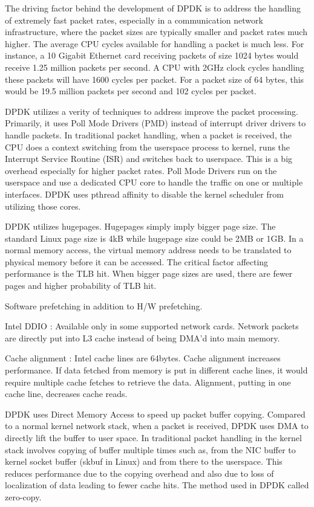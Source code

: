 \documentclass[english, 12pt, a4paper, elec, utf8, a-1b, online]{aaltothesis}
\begin{document}
The driving factor behind the development of DPDK is to address the handling of extremely fast packet rates, especially in a communication network infrastructure, where the packet sizes are typically smaller and packet rates much higher. The average CPU cycles available for handling a packet is much less. For instance, a 10 Gigabit Ethernet card receiving packets of size 1024 bytes would receive 1.25 million packets per second. A CPU with 2GHz clock cycles handling these packets will have 1600 cycles per packet. For a packet size of 64 bytes, this would be 19.5 million packets per second and 102 cycles per packet. 

DPDK utilizes a verity of techniques to address improve the packet processing. Primarily, it uses Poll Mode Drivers (PMD) instead of interrupt driver drivers to handle packets. In traditional packet handling, when a packet is received, the CPU does a context switching from the userspace process to kernel, runs the Interrupt Service Routine (ISR) and switches back to userspace. This is a big overhead especially for higher packet rates. Poll Mode Drivers run on the userspace and use a dedicated CPU core to handle the traffic on one or multiple interfaces. DPDK uses pthread affinity to disable the kernel scheduler from utilizing those cores.

DPDK utilizes hugepages. Hugepages simply imply bigger page size. The standard Linux page size is 4kB while hugepage size could be 2MB or 1GB. In a normal memory access, the virtual memory address needs to be translated to physical memory before it can be accessed. The critical factor affecting performance is the TLB hit. When bigger page sizes are used, there are fewer pages and higher probability of TLB hit.

Software prefetching in addition to H/W prefetching. 

Intel DDIO : Available only in some supported network cards. Network packets are directly put into L3 cache instead of being DMA'd into main memory.

Cache alignment : Intel cache lines are 64bytes. Cache alignment increases performance. If data fetched from memory is put in different cache lines, it would require multiple cache fetches to retrieve the data. Alignment, putting in one cache line, decreases cache reads.

DPDK uses Direct Memory Access to speed up packet buffer copying. Compared to a normal kernel network
stack, when a packet is received, DPDK uses DMA to directly lift the buffer to user space. In traditional packet handling in the kernel stack involves copying of buffer multiple times such as, from the NIC buffer to kernel socket buffer (skbuf in Linux) and from there to the userspace. This reduces performance due to the copying overhead and also due to loss of localization of data leading to fewer cache hits. The method used in DPDK called zero-copy.
\end{document}
